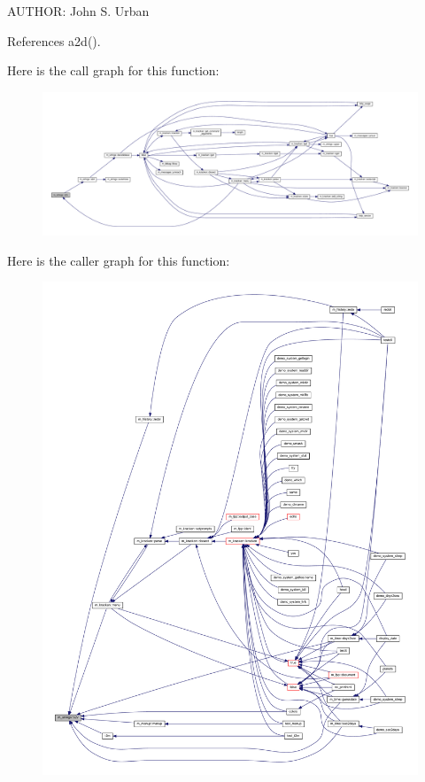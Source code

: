A\+U\+T\+H\+OR\+: John S. Urban 

References a2d().

Here is the call graph for this function\+:
\nopagebreak
\begin{figure}[H]
\begin{center}
\leavevmode
\includegraphics[width=350pt]{namespacem__strings_a7b153720f1f9b93c49094dcb1272995b_cgraph}
\end{center}
\end{figure}
Here is the caller graph for this function\+:
\nopagebreak
\begin{figure}[H]
\begin{center}
\leavevmode
\includegraphics[width=350pt]{namespacem__strings_a7b153720f1f9b93c49094dcb1272995b_icgraph}
\end{center}
\end{figure}
\mbox{\label{namespacem__strings_ad7fffe79559a666aa28e1ed598b8670f}} 
